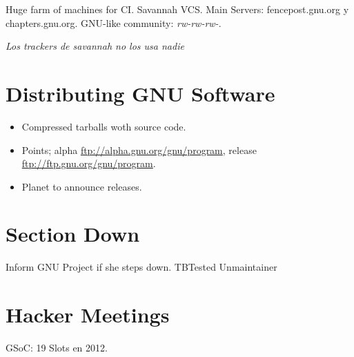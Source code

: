 \documentclass[11pt]{scrartcl}
\begin{document}
Huge farm of machines for CI.
Savannah VCS.
Main Servers: fencepost.gnu.org y chapters.gnu.org. GNU-like community: \emph{rw-rw-rw-}.

\emph{Los trackers de savannah no los usa nadie}


\section{Distributing GNU Software}
\label{sec:distro}

\begin{itemize}
	\item Compressed tarballs woth source code.
	\item Points; alpha \url{ftp://alpha.gnu.org/gnu/program}, release \url{ftp://ftp.gnu.org/gnu/program}.
	\item Planet to announce releases.
\end{itemize}

\section{Section Down}
\label{sec:down}

Inform GNU Project if she steps down.
TBTested Unmaintainer


\section{Hacker Meetings}
\label{sec:meetings}

GSoC: 19 Slots en 2012.

\end{document}
